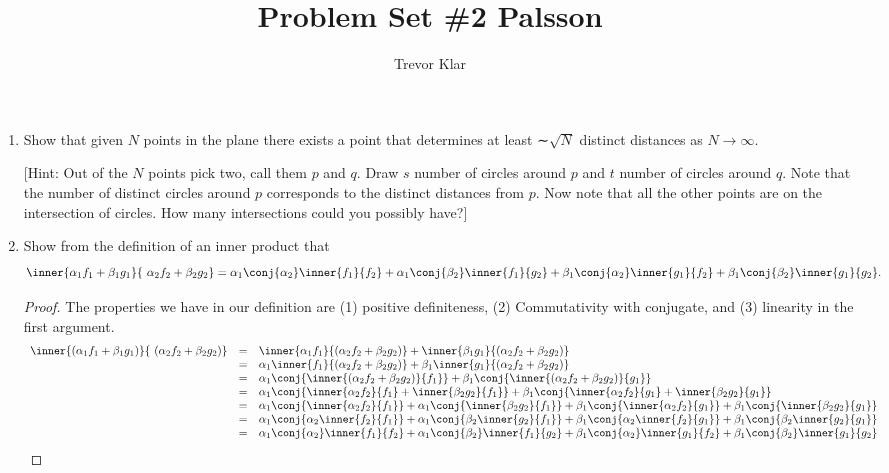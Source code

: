 \documentclass[letterpaper]{article}
\title{Problem Set \#2 \linebreak
Palsson}
\author{Trevor Klar}
\begin{document}
\maketitle

\begin{enumerate}[label=P\arabic*)]
\item Show that given $N$ points in the plane there exists a point that determines at least ∼$\sqrt{N}$ distinct distances as $N \to \infty$.

\mbox{}

[Hint: Out of the $N$ points pick two, call them $p$ and $q$. Draw $s$ number of circles around $p$ and $t$ number of circles around $q$. Note that the number of distinct circles around $p$ corresponds to the distinct distances from $p$. Now note that all the other points are on the intersection of circles.
How many intersections could you possibly have?]

\item Show from the definition of an inner product that
$$\inner{\alpha_1f_1+\beta_1g_1}{\, \, \alpha_2f_2+\beta_2g_2}=\alpha_1\conj{\alpha_2}\inner{f_1}{f_2}+\alpha_1\conj{\beta_2}\inner{f_1}{g_2}+\beta_1\conj{\alpha_2}\inner{g_1}{f_2}+\beta_1\conj{\beta_2}\inner{g_1}{g_2}.$$
\begin{proof} The properties we have in our definition are (1) positive definiteness, (2) Commutativity with conjugate, and (3) linearity in the first argument. 
	\[\begin{array}{rcl}
	\inner{(\alpha_1f_1+\beta_1g_1)}{\, \, (\alpha_2f_2+\beta_2g_2)} &=& \inner{\alpha_1f_1}{(\alpha_2f_2+\beta_2g_2)}+\inner{\beta_1g_1}{(\alpha_2f_2+\beta_2g_2)}\\
	&=& \alpha_1\inner{f_1}{(\alpha_2f_2+\beta_2g_2)}+\beta_1\inner{g_1}{(\alpha_2f_2+\beta_2g_2)}\\
	&=& \alpha_1\conj{\inner{(\alpha_2f_2+\beta_2g_2)}{f_1}}+\beta_1\conj{\inner{(\alpha_2f_2+\beta_2g_2)}{g_1}}\\
	&=& \alpha_1\conj{\inner{\alpha_2f_2}{f_1}+\inner{\beta_2g_2}{f_1}}	+	\beta_1\conj{\inner{\alpha_2f_2}{g_1}+\inner{\beta_2g_2}{g_1}}\\
	&=& \alpha_1\conj{\inner{\alpha_2f_2}{f_1}}+\alpha_1\conj{\inner{\beta_2g_2}{f_1}}	+	\beta_1\conj{\inner{\alpha_2f_2}{g_1}}+\beta_1\conj{\inner{\beta_2g_2}{g_1}}\\
	&=& \alpha_1\conj{\alpha_2\inner{f_2}{f_1}}+\alpha_1\conj{\beta_2\inner{g_2}{f_1}}	+	\beta_1\conj{\alpha_2\inner{f_2}{g_1}}+\beta_1\conj{\beta_2\inner{g_2}{g_1}}\\
	&=& \alpha_1\conj{\alpha_2}\inner{f_1}{f_2}+\alpha_1\conj{\beta_2}\inner{f_1}{g_2}	+	\beta_1\conj{\alpha_2}\inner{g_1}{f_2}+\beta_1\conj{\beta_2}\inner{g_1}{g_2}\\
	\end{array}\]
\end{proof}


\end{enumerate}
\end{document}

